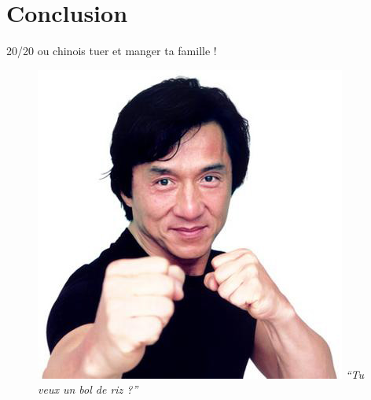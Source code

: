 \documentclass{beamer}
\newcommand{\bframe}{\begin{frame}{\secname}{\subsecname}}
\begin{document}
  \section{Conclusion}
    \bframe
     20/20 ou chinois tuer et manger ta famille !
     \begin{figure}[h]
       \centering
       \includegraphics[scale=0.4]{img/jackiechan.jpg}\newline
       \textit{``Tu veux un bol de riz ?''}
     \end{figure}

    \end{frame}
\end{document}
